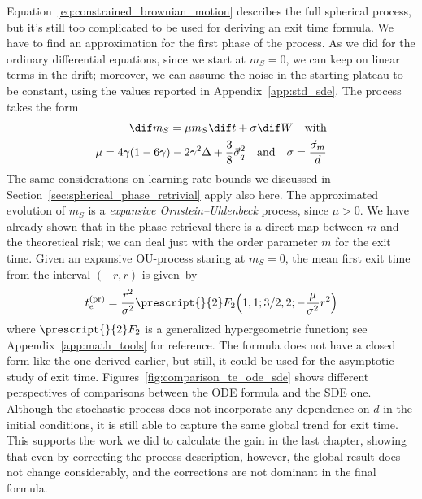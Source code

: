 Equation~\eqref{eq:constrained_brownian_motion} describes the full spherical process,
but it's still too complicated to be used for deriving an exit time formula.
We have to find an approximation for the first phase of the process. As we did 
for the ordinary differential equations, since we start at \(m_S=0\), we can keep on linear terms in the drift;
moreover, we can assume the noise in the starting plateau to be constant, using the values reported in Appendix~\ref{app:std_sde}.
The process takes the form 
\[\begin{split}
  \dif m_S = \mu m_S \dif t + \sigma \dif W \quad \text{with}\\
  \mu = 4\gamma(1-6\gamma)-2\gamma^2\Delta+\frac38 \vec{\sigma}^2_q\quad\text{and}\quad
  \sigma = \frac{\vec{\sigma}_m}{d}
\end{split}\]
The same considerations on learning rate bounds we discussed in Section~\ref{sec:spherical_phase_retrivial} apply also here.
The approximated evolution of \(m_S\) is a \emph{expansive Ornstein–Uhlenbeck} process, since \(\mu>0\).
We have already shown that in the phase retrieval there is a direct map between \(m\) and the theoretical risk;
we can deal just with the order parameter \(m\) for the exit time. 
Given an expansive OU-process staring at \(m_S=0\), the mean first exit time from the interval \((-r,r)\) is given~by~\cite{zeng2020mean}
\[
  t^{(\text{pr})}_e = \frac{r^2}{\sigma^2} \prescript{}{2}F_2{
    \left(1,1; 3/2,2; 
  -\frac{\mu}{\sigma^2}r^2\right)}
\]
where \(\prescript{}{2}F_2\) is a generalized hypergeometric function;
see Appendix~\ref{app:math_tools} for reference.
The formula does not have a closed form like the one derived earlier,
but still, it could be used for the asymptotic study of exit time.
Figures~\ref{fig:comparison_te_ode_sde} shows different perspectives of comparisons 
between the ODE formula and the SDE one. Although the stochastic process does not incorporate
any dependence on \(d\) in the initial conditions, it is still able to capture the same global trend for exit time.
This supports the work we did to calculate the gain in the last chapter,
showing that even by correcting the process description, however, 
the global result does not change considerably, and the corrections are not dominant in the final formula.
